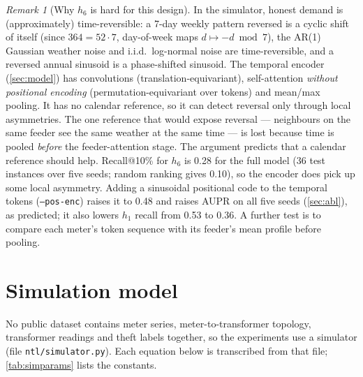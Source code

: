 \documentclass[11pt,a4paper]{article}
\theoremstyle{plain}
\theoremstyle{definition}
\theoremstyle{remark}
\newtheorem{remark}{Remark}
\begin{document}
\begin{remark}[Why $h_6$ is hard for this design]
In the simulator, honest demand is (approximately) time-reversible: a 7-day weekly pattern reversed is a cyclic shift of itself (since $364=52\cdot7$, day-of-week maps $d\mapsto -d \bmod 7$), the AR(1) Gaussian weather noise and i.i.d.\ log-normal noise are time-reversible, and a reversed annual sinusoid is a phase-shifted sinusoid. The temporal encoder (\cref{sec:model}) has convolutions (translation-equivariant), self-attention \emph{without positional encoding} (permutation-equivariant over tokens) and mean/max pooling. It has no calendar reference, so it can detect reversal only through local asymmetries. The one reference that would expose reversal --- neighbours on the same feeder see the same weather at the same time --- is lost because time is pooled \emph{before} the feeder-attention stage. The argument predicts that a calendar reference should help. Recall@10\% for $h_6$ is 0.28 for the full model (36 test instances over five seeds; random ranking gives 0.10), so the encoder does pick up some local asymmetry. Adding a sinusoidal positional code to the temporal tokens (\texttt{--pos-enc}) raises it to 0.48 and raises AUPR on all five seeds (\cref{sec:abl}), as predicted; it also lowers $h_1$ recall from 0.53 to 0.36. A further test is to compare each meter's token sequence with its feeder's mean profile before pooling.
\end{remark}

\section{Simulation model}
\label{sec:sim}
No public dataset contains meter series, meter-to-transformer topology, transformer readings and theft labels together, so the experiments use a simulator (file \texttt{ntl/simulator.py}). Each equation below is transcribed from that file; \cref{tab:simparams} lists the constants.
\end{document}
